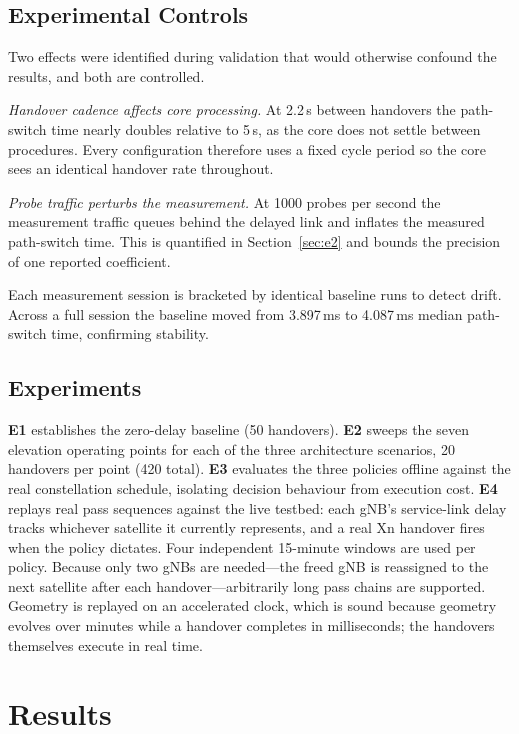\documentclass[conference]{IEEEtran}
\begin{document}
\subsection{Experimental Controls}

Two effects were identified during validation that would otherwise confound the
results, and both are controlled.

\emph{Handover cadence affects core processing.} At 2.2\,s between handovers the
path-switch time nearly doubles relative to 5\,s, as the core does not settle
between procedures. Every configuration therefore uses a fixed cycle period so
the core sees an identical handover rate throughout.

\emph{Probe traffic perturbs the measurement.} At 1000 probes per second the
measurement traffic queues behind the delayed link and inflates the measured
path-switch time. This is quantified in Section~\ref{sec:e2} and bounds the
precision of one reported coefficient.

Each measurement session is bracketed by identical baseline runs to detect
drift. Across a full session the baseline moved from 3.897\,ms to 4.087\,ms
median path-switch time, confirming stability.

\subsection{Experiments}

\textbf{E1} establishes the zero-delay baseline (50 handovers).
\textbf{E2} sweeps the seven elevation operating points for each of the three
architecture scenarios, 20 handovers per point (420 total).
\textbf{E3} evaluates the three policies offline against the real constellation
schedule, isolating decision behaviour from execution cost.
\textbf{E4} replays real pass sequences against the live testbed: each gNB's
service-link delay tracks whichever satellite it currently represents, and a
real Xn handover fires when the policy dictates. Four independent 15-minute
windows are used per policy. Because only two gNBs are needed---the freed gNB is
reassigned to the next satellite after each handover---arbitrarily long pass
chains are supported. Geometry is replayed on an accelerated clock, which is
sound because geometry evolves over minutes while a handover completes in
milliseconds; the handovers themselves execute in real time.

\section{Results}
\end{document}
